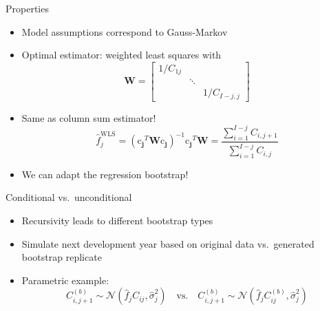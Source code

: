 \documentclass[tikz]{beamer}
\begin{document}
\begin{frame}{Properties}
  \begin{itemize}
    \item Model assumptions correspond to Gauss-Markov
    \item Optimal estimator: weighted least squares with
          \begin{equation*}
            \mathbf{W} =
            \begin{bmatrix}
              1 / C_{1j} &        &                  \\
                         & \ddots &                  \\
                         &        & 1 / C_{I - j, j}
            \end{bmatrix}
          \end{equation*}
    \item Same as column sum estimator!
          \begin{equation*}
            \widehat{f}^{\mathrm{WLS}}_j = (\bm{\mathrm{c}_j}^T \mathbf{W} \bm{\mathrm{c}_j})^{-1} \bm{\mathrm{c}_j}^T \mathbf{W} = \frac{\sum_{i = 1}^{I - j} C_{i, j + 1}}{\sum_{i = 1}^{I - j} C_{i, j}}
          \end{equation*}
    \item We can adapt the regression bootstrap!
  \end{itemize}
\end{frame}

\begin{frame}{Conditional vs.\ unconditional}
  \begin{itemize}
    \item Recursivity leads to different bootstrap types
    \item Simulate next development year based on original data vs.\ generated bootstrap replicate
    \item Parametric example:
          \begin{equation*}
            C^{(b)}_{i, j + 1} \sim \mathcal{N}(\widehat{f}_j C_{ij}, \widehat{\sigma}^2_j) \quad \text{vs.} \quad C^{(b)}_{i, j + 1} \sim \mathcal{N}(\widehat{f}_j C^{(b)}_{ij}, \widehat{\sigma}^2_j)
          \end{equation*}
  \end{itemize}
\end{frame}
\end{document}
